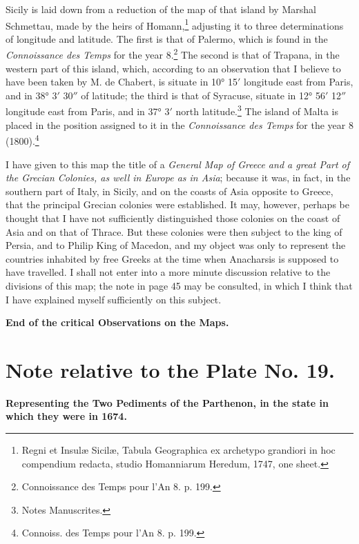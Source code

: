 \documentclass[a4paper, 11pt, oneside, polutonikogreek, english]{article}
\begin{document}
Sicily is laid down from a reduction of the map of that island by Marshal Schmettau, made by the heirs of Homann,\footnote{Regni et Insulæ Sicilæ, Tabula Geographica ex archetypo grandiori in hoc compendium redacta, studio Homanniarum Heredum, 1747, one sheet.} adjusting it to three determinations of longitude and latitude. The first is that of Palermo, which is found in the \emph{Connoissance des Temps} for the year 8.\footnote{Connoissance des Temps pour l'An 8. p. 199.} The second is that of Trapana, in the western part of this island, which, according to an observation that I believe to have been taken by M. de Chabert, is situate in 10° 15$'$ longitude east from Paris, and in 38° 3$'$ 30$''$ of latitude; the third is that of Syracuse, situate in 12° 56$'$ 12$''$ longitude east from Paris, and in 37° 3$'$ north latitude.\footnote{Notes Manuscrites.} The island of Malta is placed in the position assigned to it in the \emph{Connoissance des Temps} for the year 8 (1800).\footnote{Connoiss. des Temps pour l'An 8. p. 199.}

I have given to this map the title of a \emph{General Map of Greece and a great Part of the Grecian Colonies, as well in Europe as in Asia}; because it was, in fact, in the southern part of Italy, in Sicily, and on the coasts of Asia opposite to Greece, that the principal Grecian colonies were established. It may, however, perhaps be thought that I have not sufficiently distinguished those colonies on the coast of Asia and on that of Thrace. But these colonies were then subject to the king of Persia, and to Philip King of Macedon, and my object was only to represent the countries inhabited by free Greeks at the time when Anacharsis is supposed to have travelled. I shall not enter into a more minute discussion relative to the divisions of this map; the note in page 45 may be consulted, in which I think that I have explained myself sufficiently on this subject.

\begin{center}
\textbf{End of the critical Observations on the Maps.}
\end{center}
\clearpage
\section{Note relative to the Plate No. 19.}
\begin{center}
\textbf{Representing the Two Pediments of the Parthenon, in the state in which they were in 1674.}
\end{center}
\end{document}
